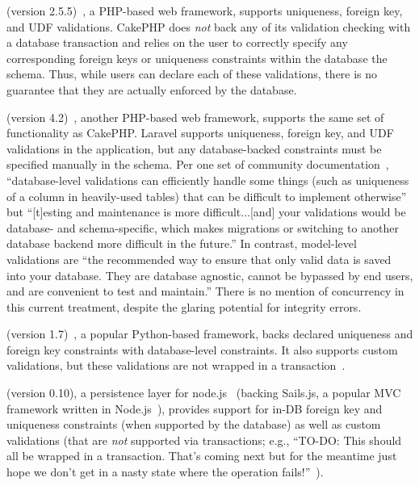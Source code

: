  (version 2.5.5)~\cite{code-cakephp}, a PHP-based web
framework, supports uniqueness, foreign key, and UDF
validations. CakePHP does \textit{not} back any of its validation
checking with a database transaction and relies on the user to
correctly specify any corresponding foreign keys or uniqueness
constraints within the database the schema. Thus, while users can
declare each of these validations, there is no guarantee that they are
actually enforced by the database.

 (version 4.2)~\cite{code-laravel}, another PHP-based web
framework, supports the same set of functionality as CakePHP. Laravel
supports uniqueness, foreign key, and UDF validations in the
application, but any database-backed constraints must be specified
manually in the schema. Per one set of community documentation~\cite{laravel-book}, ``database-level
validations can efficiently handle some things (such as uniqueness of
a column in heavily-used tables) that can be difficult to implement
otherwise'' but ``[t]esting and maintenance is more difficult...[and]
your validations would be database- and schema-specific, which makes
migrations or switching to another database backend more difficult in
the future.'' In contrast, model-level validations are ``the
recommended way to ensure that only valid data is saved into your
database. They are database agnostic, cannot be bypassed by end users,
and are convenient to test and maintain.'' There
is no mention of concurrency in this current treatment, despite the
glaring potential for integrity errors.

 (version 1.7)~\cite{code-django}, a popular Python-based
framework, backs declared
uniqueness and foreign key constraints with database-level
constraints. It also supports custom validations, but these
validations are not wrapped
in a transaction~\cite{code-django-constraints}.

 (version 0.10), a persistence layer for
node.js~\cite{code-waterline} (backing Sails.js, a popular MVC
framework written in Node.js~\cite{code-sails}), provides support for
in-DB foreign key and uniqueness constraints (when supported by the
database) as well as custom validations (that are \textit{not}
supported via transactions; e.g., ``TO-DO: This should all be wrapped
in a transaction. That's coming next but for the meantime just hope we
don't get in a nasty state where the operation
fails!''~\cite{code-waterline-txn}).


